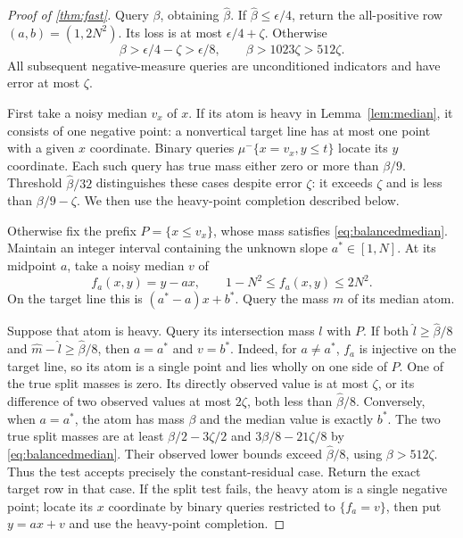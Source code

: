 \begin{proof}[Proof of \cref{thm:fast}]
Query $\beta$, obtaining $\widehat\beta$. If $\widehat\beta\le\epsilon/4$, return the all-positive row $(a,b)=(1,2N^2)$. Its loss is at most $\epsilon/4+\zeta$. Otherwise
\[
 \beta>\epsilon/4-\zeta>\epsilon/8,
 \qquad \beta>1023\zeta>512\zeta.
\]
All subsequent negative-measure queries are unconditioned indicators and have error at most $\zeta$.

First take a noisy median $v_x$ of $x$. If its atom is heavy in Lemma~\ref{lem:median}, it consists of one negative point: a nonvertical target line has at most one point with a given $x$ coordinate. Binary queries $\mu^-\{x=v_x,y\le t\}$ locate its $y$ coordinate. Each such query has true mass either zero or more than $\beta/9$. Threshold $\widehat\beta/32$ distinguishes these cases despite error $\zeta$: it exceeds $\zeta$ and is less than $\beta/9-\zeta$. We then use the heavy-point completion described below.

Otherwise fix the prefix $P=\{x\le v_x\}$, whose mass satisfies \eqref{eq:balancedmedian}. Maintain an integer interval containing the unknown slope $a^*\in[1,N]$. At its midpoint $a$, take a noisy median $v$ of
\[
 f_a(x,y)=y-ax,
 \qquad 1-N^2\le f_a(x,y)\le2N^2.
\]
On the target line this is $(a^*-a)x+b^*$. Query the mass $m$ of its median atom.

Suppose that atom is heavy. Query its intersection mass $l$ with $P$. If both $\widehat l\ge\widehat\beta/8$ and $\widehat m-\widehat l\ge\widehat\beta/8$, then $a=a^*$ and $v=b^*$. Indeed, for $a\ne a^*$, $f_a$ is injective on the target line, so its atom is a single point and lies wholly on one side of $P$. One of the true split masses is zero. Its directly observed value is at most $\zeta$, or its difference of two observed values at most $2\zeta$, both less than $\widehat\beta/8$. Conversely, when $a=a^*$, the atom has mass $\beta$ and the median value is exactly $b^*$. The two true split masses are at least $\beta/2-3\zeta/2$ and $3\beta/8-21\zeta/8$ by \eqref{eq:balancedmedian}. Their observed lower bounds exceed $\widehat\beta/8$, using $\beta>512\zeta$. Thus the test accepts precisely the constant-residual case. Return the exact target row in that case. If the split test fails, the heavy atom is a single negative point; locate its $x$ coordinate by binary queries restricted to $\{f_a=v\}$, then put $y=ax+v$ and use the heavy-point completion.


\end{proof}
